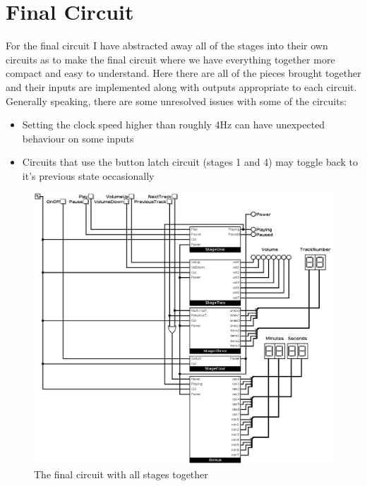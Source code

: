 \documentclass[11pt]{scrartcl}
\begin{document}
\pagebreak

\section*{Final Circuit}
For the final circuit I have abstracted away all of the stages into their own circuits as
to make the final circuit where we have everything together more compact and easy to
understand. Here there are all of the pieces brought together and their inputs are
implemented along with outputs appropriate to each circuit. Generally speaking, there
are some unresolved issues with some of the circuits:
\begin{itemize}
    \item Setting the clock speed higher than roughly 4Hz can have unexpected behaviour on some inputs
    \item Circuits that use the button latch circuit (stages 1 and 4) may toggle back to it's previous state occasionally
\end{itemize}
\begin{figure}[h]
    \centering
    \includegraphics[scale=0.35]{images/main.png}
    \caption{The final circuit with all stages together}
\end{figure}
\end{document}
